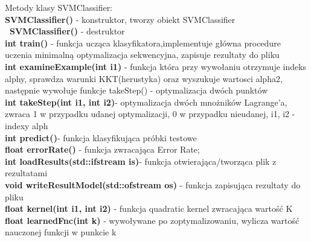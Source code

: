 \documentclass[[10pt,a4paper]{article}
\begin{document}
\begin{enumerate}
Metody klasy SVMClassifier:\\
\textbf{SVMClassifier()} - konstruktor, tworzy obiekt SVMClassifier\\
\textbf{~SVMClassifier()} - destruktor\\
\textbf{int train() }- funkcja ucząca klasyfikatora,implementuje główna procedure uczenia minimalną optymalizacja sekwencyjna, zapisuje rezultaty do pliku\\
\textbf{int examineExample(int i1) }- funkcja która przy wywołaniu otrzymuje indeks alphy, sprawdza warunki KKT(herustyka) oraz wyszukuje wartosci alpha2, następnie wywołuje funkcje takeStep() - optymalizacja dwóch punktów\\
\textbf{int takeStep(int i1, int i2)}- optymalizacja dwóch mnożników Lagrange'a, zwraca 1 w przypadku udanej optymalizacji, 0 w przypadku nieudanej, i1, i2 - indexy alph\\
\textbf{int predict()}- funkcja klasyfikująca próbki testowe\\
\textbf{float errorRate()} - funkcja zwracająca Error Rate;\\
\textbf{int loadResults(std::ifstream is)}- funkcja otwierająca/tworząca plik z rezultatami \\
\textbf{void writeResultModel(std::ofstream os)} - funkcja zapisująca rezultaty do pliku\\
\textbf{float kernel(int i1, int i2)} - funkcja quadratic kernel zwracająca wartość K\\
\textbf{float learnedFnc(int k)} - wywoływane po zoptymalizowaniu, wylicza wartość nauczonej funkcji w punkcie k\\



\end{enumerate}
\end{document}
